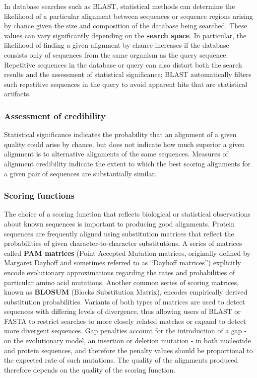 \documentclass[
]{book}
\begin{document}
In database searches such as BLAST, statistical methods can determine the likelihood of a particular alignment between sequences or sequence regions arising by chance given the size and composition of the database being searched. These values can vary significantly depending on the \textbf{search space}. In particular, the likelihood of finding a given alignment by chance increases if the database consists only of sequences from the same organism as the query sequence. Repetitive sequences in the database or query can also distort both the search results and the assessment of statistical significance; BLAST automatically filters such repetitive sequences in the query to avoid apparent hits that are statistical artifacts.

\hypertarget{assessment-of-credibility}{%
\subsubsection{Assessment of credibility}\label{assessment-of-credibility}}

Statistical significance indicates the probability that an alignment of a given quality could arise by chance, but does not indicate how much superior a given alignment is to alternative alignments of the same sequences. Measures of alignment credibility indicate the extent to which the best scoring alignments for a given pair of sequences are substantially similar.

\hypertarget{scoring-functions}{%
\subsubsection{Scoring functions}\label{scoring-functions}}

The choice of a scoring function that reflects biological or statistical observations about known sequences is important to producing good alignments. Protein sequences are frequently aligned using substitution matrices that reflect the probabilities of given character-to-character substitutions. A series of matrices called \textbf{PAM matrices} (Point Accepted Mutation matrices, originally defined by Margaret Dayhoff and sometimes referred to as ``Dayhoff matrices'') explicitly encode evolutionary approximations regarding the rates and probabilities of particular amino acid mutations. Another common series of scoring matrices, known as \textbf{BLOSUM} (Blocks Substitution Matrix), encodes empirically derived substitution probabilities. Variants of both types of matrices are used to detect sequences with differing levels of divergence, thus allowing users of BLAST or FASTA to restrict searches to more closely related matches or expand to detect more divergent sequences. Gap penalties account for the introduction of a gap - on the evolutionary model, an insertion or deletion mutation - in both nucleotide and protein sequences, and therefore the penalty values should be proportional to the expected rate of such mutations. The quality of the alignments produced therefore depends on the quality of the scoring function.
\end{document}
